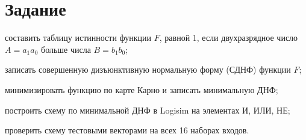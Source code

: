\section{Задание}
\begin{bbttask}
  \item составить таблицу истинности функции $F$, равной 1, если двухразрядное число
  $A = a_1 a_0$ больше числа $B = b_1 b_0$;\label{task:table}
  \item записать совершенную дизъюнктивную нормальную форму (СДНФ) функции
  $F$;\label{task:sdnf}
  \item минимизировать функцию по карте Карно и записать минимальную ДНФ;\label{task:min}
  \item построить схему по минимальной ДНФ в Logisim на элементах И, ИЛИ,
  НЕ;\label{task:scheme}
  \item проверить схему тестовыми векторами на всех 16 наборах входов.\label{task:test}
\end{bbttask}
